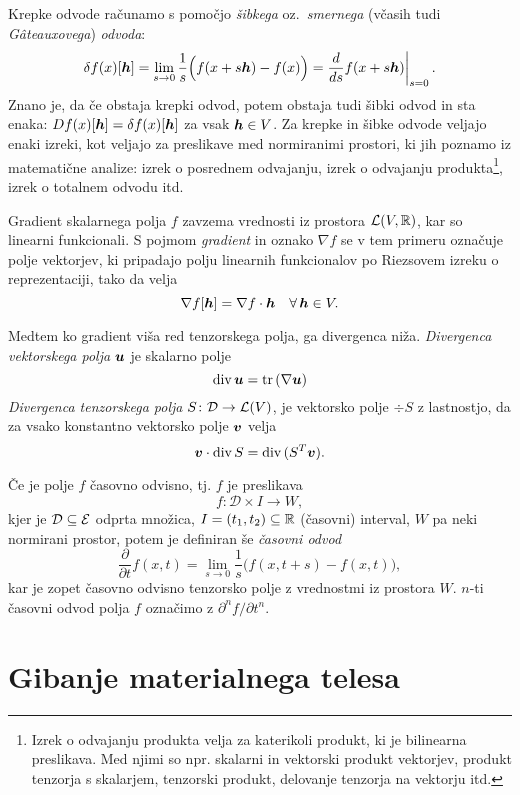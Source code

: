 Krepke odvode računamo s pomočjo \emph{šibkega} oz.~\emph{smernega} (včasih tudi \emph{Gâteauxovega}) \emph{odvoda}:
\begin{equation*}
	\delta f(x)[\vek{h}]=\lim_{s\to 0}\frac{1}{s}\Big(f(x+s\vek{h})-f(x)\Big)=
	\at{\frac{d}{ds}f(x+s\vek{h})}{s=0}.
\end{equation*}
Znano je, da če obstaja krepki odvod,
potem obstaja tudi šibki odvod in sta enaka: $Df(x)[\boldsymbol h]=\delta f(x)[\boldsymbol h]$ za vsak $\boldsymbol h\in V$.
Za krepke in šibke odvode veljajo enaki izreki, kot veljajo za preslikave med normiranimi prostori, ki jih
poznamo iz matematične analize: izrek o posrednem odvajanju, izrek o odvajanju produkta\footnote{
Izrek o odvajanju produkta velja za katerikoli produkt, ki je bilinearna preslikava. Med njimi so
npr. skalarni in vektorski produkt vektorjev, produkt tenzorja s skalarjem, tenzorski produkt,
delovanje tenzorja na vektorju itd.},
izrek o totalnem odvodu itd.

Gradient skalarnega polja $f$ zavzema vrednosti iz prostora $\mathcal L(V,\mathbb R)$, kar so linearni funkcionali.
S pojmom \emph{gradient} in oznako $\nabla f$ se v tem primeru označuje polje vektorjev, ki pripadajo polju
linearnih funkcionalov po Riezsovem izreku o reprezentaciji, tako da velja
\[ \nabla f[\boldsymbol h]=\nabla f \cdot \boldsymbol h \quad \forall\, \boldsymbol h\in V. \]

Medtem ko gradient viša red tenzorskega polja, ga divergenca niža.
\emph{Divergenca vektorskega polja} $\boldsymbol u$ je skalarno polje
\begin{equation*}
	\mathrm{div}\,\boldsymbol u=\mathrm{tr}\,(\nabla\boldsymbol u)
\end{equation*}
\emph{Divergenca tenzorskega polja} $S\colon\mathcal{D}\to\mathcal L(V)$, je vektorsko polje $\div S$ z lastnostjo,
da za vsako konstantno vektorsko polje $\boldsymbol v$ velja
\[ \boldsymbol v\cdot\mathrm{div}\, S = \mathrm{div}\,(S^T\boldsymbol v). \]

Če je polje $f$ časovno odvisno, tj. $f$ je preslikava
\[ f\colon\mathcal{D}\times I\to W, \]
kjer je $\mathcal{D}\subseteq\mathcal E$ odprta množica, $I=(t_1,t_2)\subseteq\mathbb R$ (časovni) interval, $W$ pa neki normirani prostor,
potem je definiran še \emph{časovni odvod}
\[ \frac{\partial}{\partial t}f(x,t) = \lim_{s\to 0}\frac{1}{s}\Big(f(x,t+s)-f(x,t)\Big), \]
kar je zopet časovno odvisno tenzorsko polje z vrednostmi iz prostora $W$. $n$-ti
časovni odvod polja $f$ označimo z $\partial^n f/\partial t^n$.


\section{Gibanje materialnega telesa}


